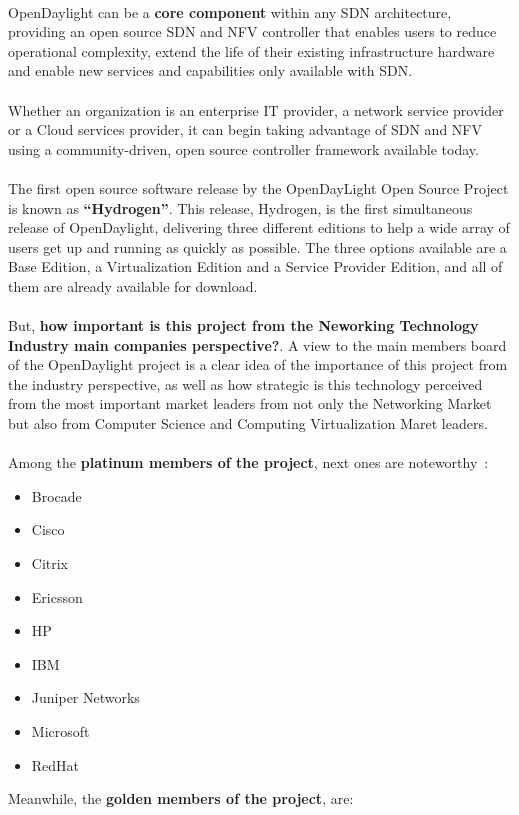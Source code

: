 \documentclass[a4paper, 12pt]{book}
\begin{document}
\\
OpenDaylight can be a \textbf{core component} within any SDN architecture, providing an open source SDN and NFV controller that enables users to reduce operational complexity, extend the life of their existing infrastructure hardware and enable new services and capabilities only available with SDN.\\
\\
Whether an organization is an enterprise IT provider, a network service provider or a Cloud services provider, it can begin taking advantage of SDN and NFV using a community-driven, open source controller framework available today.\\
\\
The first open source software release by the OpenDayLight Open Source Project is known as \textbf{``Hydrogen''}. This release, Hydrogen, is the first simultaneous release of OpenDaylight, delivering three different editions to help a wide array of users get up and running as quickly as possible. The three options available are a Base Edition, a Virtualization Edition and a Service Provider Edition, and all of them are already available for download.\\
\\
But, \textbf{how important is this project from the Neworking Technology Industry main companies perspective?}. A view to the main members board of the OpenDaylight project is a clear idea of the importance of this project from the industry perspective, as well as how strategic is this technology perceived from the most important market leaders from not only the Networking Market but also from Computer Science and Computing Virtualization Maret leaders.\\
\\
Among the \textbf{platinum members of the project}, next ones are noteworthy~\cite{OpenDaylightMembers}:
 \begin{itemize}\itemsep0pt
  \item Brocade
  \item Cisco
  \item Citrix
  \item Ericsson
  \item HP
  \item IBM
  \item Juniper Networks
  \item Microsoft
  \item RedHat
 \end{itemize}
Meanwhile, the \textbf{golden members of the project}, are:
\end{document}
